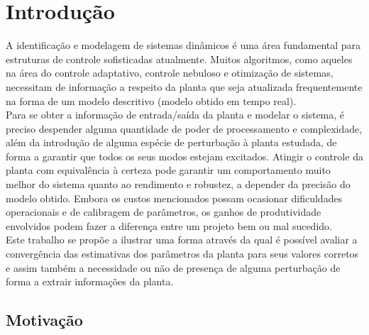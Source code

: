 \documentclass[
	12pt,				%
	openright,			%
	twoside,			%
	a4paper,			%
	english,			%
	french,				%
	spanish,			%
	brazil				%
	]{abntex2}
\begin{document}
\tableofcontents*
\thispagestyle{simple}

\textual


\chapter[Introdução]{Introdução}
\renewcommand{\thepage}{\arabic{page}}%
\setcounter{page}{2}
A identificação e modelagem de sistemas dinâmicos é uma área fundamental para estruturas de controle sofisticadas atualmente. Muitos algoritmos, como aqueles na área do controle adaptativo, controle nebuloso e otimização de sistemas, necessitam de informação a respeito da planta que seja atualizada frequentemente na forma de um modelo descritivo (modelo obtido em tempo real).\\

Para se obter a informação de entrada/saída da planta e modelar o sistema, é preciso despender alguma quantidade de poder de processamento e complexidade, além da introdução de alguma espécie de perturbação à planta estudada, de forma a garantir que todos os seus modos estejam excitados. Atingir o controle da planta com equivalência à certeza pode garantir um comportamento muito melhor do sistema quanto ao rendimento e robustez, a depender da precisão do modelo obtido. Embora os custos mencionados possam ocasionar dificuldades operacionais e de calibragem de parâmetros, os ganhos de produtividade envolvidos podem fazer a diferença entre um projeto bem ou mal sucedido. \\ 

Este trabalho se propõe a ilustrar uma forma através da qual é possível avaliar a convergência das estimativas dos parâmetros da planta para seus valores corretos e assim também a necessidade ou não de presença de alguma perturbação de forma a extrair informações da planta.\\

\section{Motivação}
\end{document}
